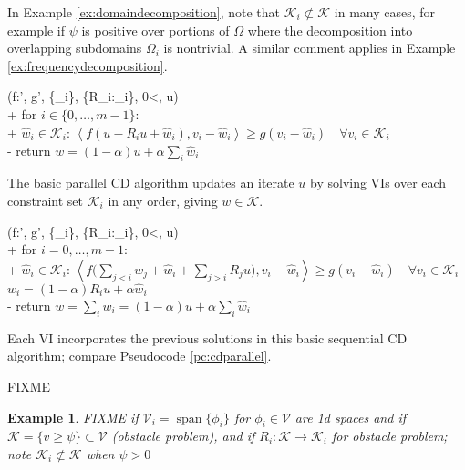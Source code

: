 \documentclass[letterpaper,final,12pt,reqno]{amsart}
\theoremstyle{cstyle}
\theoremstyle{dstyle}
\newtheorem{example}[theorem]{Example}
\numberwithin{equation}{section}
\numberwithin{figure}{section}
\numberwithin{table}{section}
\numberwithin{theorem}{section}
\newcommand{\cK}{\mathcal{K}}
\newcommand{\cV}{\mathcal{V}}
\newcommand{\ip}[2]{\left<#1,#2\right>}
\newcommand{\Span}{\operatorname{span}}
\begin{document}
In Example \ref{ex:domaindecomposition}, note that $\cK_i \not\subset \cK$ in many cases, for example if $\psi$ is positive over portions of $\Omega$ where the decomposition into overlapping subdomains $\Omega_i$ is nontrivial.  A similar comment applies in Example \ref{ex:frequencydecomposition}.

\begin{pcode}[ht]
\begin{pseudo*}
(f:\cK \to \cV', g\in \cV', \{\cK_i\}, \{R_i:\cK \to \cK_i\}, 0<\alpha{}, u\in\cK)\text{:} \\+
    for $i \in \{0,\dots,m-1\}$: \qquad \qquad {} \\+
        $\hat w_i\in \cK_i$: \quad $\ip{f(u - R_i u + \hat w_i)}{v_i-\hat w_i} \ge g(v_i-\hat w_i) \quad \forall v_i\in \cK_i$ \\-
    return $w=(1-\alpha) u + \alpha \sum_i \hat w_i$
\end{pseudo*}
\caption{The basic parallel CD algorithm updates an iterate $u$ by solving VIs over each constraint set $\cK_i$ in any order, giving $w\in \cK$.}
\label{pc:cdparallel}
\end{pcode}

\begin{pcode}[ht]
\begin{pseudo*}
(f:\cK \to \cV', g\in \cV', \{\cK_i\}, \{R_i:\cK \to \cK_i\}, 0<\alpha{}, u\in\cK)\text{:} \\+
    for $i = 0,\dots,m-1$: \qquad \qquad {} \\+
        $\hat w_i\in \cK_i$: \quad $\displaystyle \ip{f\Big(\sum_{j<i} w_j + \hat w_i + \sum_{j>i} R_j u\Big)}{v_i-\hat w_i} \ge g(v_i-\hat w_i) \quad \forall v_i\in \cK_i$ \\
        $w_i = (1-\alpha) R_i u + \alpha \hat w_i$ \\-
    return $w= \sum_i w_i = (1-\alpha) u + \alpha \sum_i \hat w_i$
\end{pseudo*}
\caption{Each VI incorporates the previous solutions in this basic sequential CD algorithm; compare Pseudocode \ref{pc:cdparallel}.}
\label{pc:cdsequential}
\end{pcode}

FIXME

\begin{example}  FIXME if $\cV_i=\Span\{\phi_i\}$ for $\phi_i\in\cV$ are 1d spaces and if $\cK = \{v \ge \psi\} \subset \cV$ (obstacle problem), and if $R_i : \cK \to \cK_i$ for obstacle problem; note $\cK_i \not\subset \cK$ when $\psi>0$
\end{example}
\end{document}
